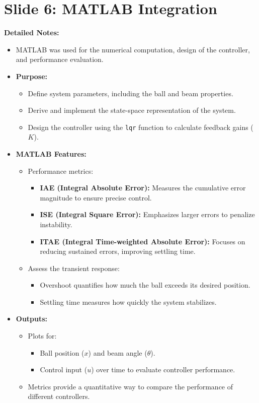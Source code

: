\documentclass[12pt]{article}
\begin{document}
\section*{Slide 6: MATLAB Integration}
\textbf{Detailed Notes:}
\begin{itemize}
    \item MATLAB was used for the numerical computation, design of the controller, and performance evaluation.
    \item \textbf{Purpose:}
    \begin{itemize}
        \item Define system parameters, including the ball and beam properties.
        \item Derive and implement the state-space representation of the system.
        \item Design the controller using the \texttt{lqr} function to calculate feedback gains (\(K\)).
    \end{itemize}
    \item \textbf{MATLAB Features:}
    \begin{itemize}
        \item Performance metrics:
        \begin{itemize}
            \item \textbf{IAE (Integral Absolute Error):} Measures the cumulative error magnitude to ensure precise control.
            \item \textbf{ISE (Integral Square Error):} Emphasizes larger errors to penalize instability.
            \item \textbf{ITAE (Integral Time-weighted Absolute Error):} Focuses on reducing sustained errors, improving settling time.
        \end{itemize}
        \item Assess the transient response:
        \begin{itemize}
            \item Overshoot quantifies how much the ball exceeds its desired position.
            \item Settling time measures how quickly the system stabilizes.
        \end{itemize}
    \end{itemize}
    \item \textbf{Outputs:}
    \begin{itemize}
        \item Plots for:
        \begin{itemize}
            \item Ball position (\(x\)) and beam angle (\(\theta\)).
            \item Control input (\(u\)) over time to evaluate controller performance.
        \end{itemize}
        \item Metrics provide a quantitative way to compare the performance of different controllers.
    \end{itemize}
\end{itemize}
\end{document}
